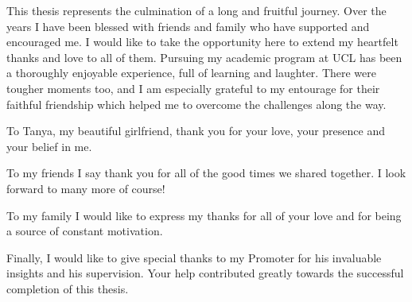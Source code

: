 This thesis represents the culmination of a long and fruitful journey. Over the years I have been blessed with friends and family who have supported and encouraged me. I would like to take the opportunity here to extend my heartfelt thanks and love to all of them. Pursuing my academic program at UCL has been a thoroughly enjoyable experience, full of learning and laughter. There were tougher moments too, and I am especially grateful to my entourage for their faithful friendship which helped me to overcome the challenges along the way. 

To Tanya, my beautiful girlfriend, thank you for your love, your presence and your belief in me. 

To my friends I say thank you for all of the good times we shared together. I look forward to many more of course!

To my family I would like to express my thanks for all of your love and for being a source of constant motivation.

Finally, I would like to give special thanks to my Promoter for his invaluable insights and his supervision. Your help contributed greatly towards the successful completion of this thesis.    
